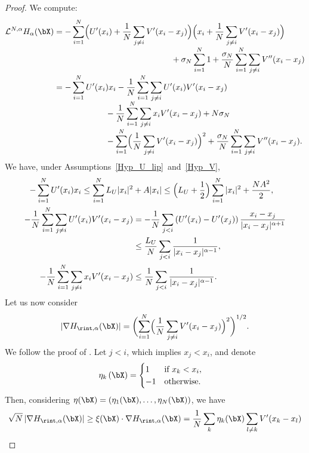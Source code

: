 \begin{proof}
We compute:
\begin{align*}
\mathcal{L}^{N,\alpha} H_{\alpha}(\bX)
&=-\sum_{i=1}^N\Bigl(U'(x_i)+\frac{1}{N}\sum_{j\neq i}V'(x_i-x_j)\Bigr)\Bigl(x_i+\frac{1}{N}\sum_{j\neq i}V'(x_i-x_j)\Bigr)\\[-3pt]
&\hspace*{5cm}+\sigma_N\sum_{i=1}^N1+\frac{\sigma_N}{N}\sum_{i=1}^N\sum_{j\neq i}V''(x_i-x_j)\\[-3pt]
&=-\sum_{i=1}^N U'(x_i)x_i-\frac{1}{N}\sum_{i=1}^N\sum_{j\neq i}U'(x_i)V'(x_i-x_j)\\[-5pt]
&\hspace*{2.2cm}-\frac{1}{N}\sum_{i=1}^N\sum_{j\neq i}x_iV'(x_i-x_j)+N\sigma_N\\[-3pt]
&\hspace*{2.2cm}-\sum_{i=1}^N\Bigl(\frac{1}{N}\sum_{j\neq i}V'(x_i-x_j)\Bigr)^2+\frac{\sigma_N}{N}\sum_{i=1}^N\sum_{j\neq i}V''(x_i-x_j).
\end{align*}
We have, under Assumptions~\ref{Hyp_U_lip}~and~\ref{Hyp_V},
\begin{align}
-\sum_{i=1}^N U'(x_i)x_i\leq\sum_{i=1}^NL_U|x_i|^2&+A|x_i|\leq\Bigl(L_U+\frac{1}{2}\Bigr)\sum_{i=1}^N|x_i|^2+\frac{NA^2}{2},\label{ineq_lya_U}\\
-\frac{1}{N}\sum_{i=1}^N\sum_{j\neq i}U'(x_i)V'(x_i-x_j)&=-\frac{1}{N}\sum_{j< i}\left(U'(x_i)-U'(x_j)\right)\frac{x_i-x_j}{|x_i-x_j|^{\alpha+1}}\label{ineq_lya_V}\\
&\leq \frac{L_U}{N}\sum_{j< i}\frac{1}{|x_i-x_j|^{\alpha-1}},\notag\\
-\frac{1}{N}\sum_{i=1}^N\sum_{j\neq i}x_iV'(x_i-x_j)&\leq \frac{1}{N}\sum_{j< i}\frac{1}{|x_i-x_j|^{\alpha-1}}\label{ineq_lya_V_2}.
\end{align}
Let us now consider
\[
\left|\nabla H_{\rint, \alpha}(\bX)\right|=\biggl(\sum_{i=1}^N\Bigl(\frac{1}{N}\sum_{j\neq i}V'(x_i-x_j)\Bigr)^2\biggr)^{1/2}.
\]
We follow the proof of \cite[Lem.\,5.15]{herzog_mattingly}. Let $j<i$, which implies $x_j<x_i$, and denote
\begin{align*}
\eta_k\left(\bX\right)&=\begin{cases}
1&\text{if }x_k<x_i,\\
-1 &\text{otherwise.}\end{cases}
\end{align*}
Then, considering $\eta(\bX)=\left(\eta_1(\bX),\dots,\eta_N(\bX)\right)$, we have
\begin{align*}
\sqrt{N}\left|\nabla H_{\rint, \alpha}(\bX)\right|&\geq \xi(\bX)\cdot\nabla H_{\rint,\alpha}(\bX)=\frac{1}{N}\sum_k\eta_k(\bX)\sum_{l\neq k}V'(x_k-x_l)\\

\end{align*}
\end{proof}
